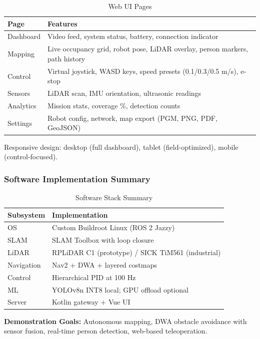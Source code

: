\begin{table}[H]
\centering
\caption{Web UI Pages}
\label{tab:ui-pages}
\begin{tabular}{@{}lp{8cm}@{}}
\toprule
\textbf{Page} & \textbf{Features} \\
\midrule
Dashboard & Video feed, system status, battery, connection indicator \\
Mapping & Live occupancy grid, robot pose, LiDAR overlay, person markers, path history \\
Control & Virtual joystick, WASD keys, speed presets (0.1/0.3/0.5 m/s), e-stop \\
Sensors & LiDAR scan, IMU orientation, ultrasonic readings \\
Analytics & Mission stats, coverage \%, detection counts \\
Settings & Robot config, network, map export (PGM, PNG, PDF, GeoJSON) \\
\bottomrule
\end{tabular}
\end{table}

Responsive design: desktop (full dashboard), tablet (field-optimized), mobile (control-focused).

\subsubsection{Software Implementation Summary}

\begin{table}[H]
\centering
\caption{Software Stack Summary}
\begin{tabular}{@{}ll@{}}
\toprule
\textbf{Subsystem} & \textbf{Implementation} \\
\midrule
OS & Custom Buildroot Linux (ROS 2 Jazzy) \\
SLAM & SLAM Toolbox with loop closure \\
LiDAR & RPLiDAR C1 (prototype) / SICK TiM561 (industrial) \\
Navigation & Nav2 + DWA + layered costmaps \\
Control & Hierarchical PID at 100 Hz \\
ML & YOLOv8n INT8 local; GPU offload optional \\
Server & Kotlin gateway + Vue UI \\
\bottomrule
\end{tabular}
\end{table}

\textbf{Demonstration Goals:} Autonomous mapping, DWA obstacle avoidance with sensor fusion, real-time person detection, web-based teleoperation.

